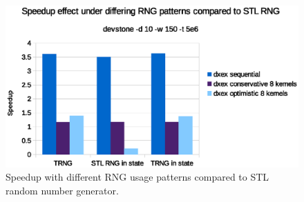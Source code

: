 \begin{figure}
    \center
    \includegraphics[width=\columnwidth]{fig/rngspeedupeffectdevstone.eps}
    \caption{Speedup with different RNG usage patterns compared to STL random number generator.}
    \label{fig:Queuerngspeedup}
\end{figure}
